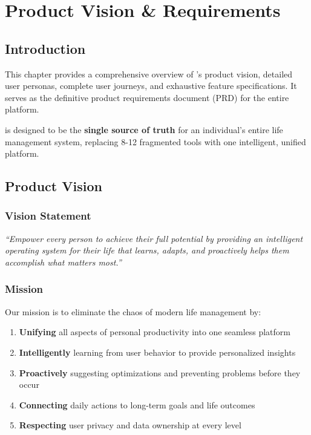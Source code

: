 \chapter{Product Vision \& Requirements}
\label{ch:product-vision}

\section{Introduction}

This chapter provides a comprehensive overview of \lifeos{}'s product vision, detailed user personas, complete user journeys, and exhaustive feature specifications. It serves as the definitive product requirements document (PRD) for the entire platform.

\begin{keypoint}
\lifeos{} is designed to be the \textbf{single source of truth} for an individual's entire life management system, replacing 8-12 fragmented tools with one intelligent, unified platform.
\end{keypoint}

\section{Product Vision}

\subsection{Vision Statement}

\begin{center}
\large\textit{``Empower every person to achieve their full potential by providing an intelligent operating system for their life that learns, adapts, and proactively helps them accomplish what matters most.''}
\end{center}

\subsection{Mission}

Our mission is to eliminate the chaos of modern life management by:

\begin{enumerate}
    \item \textbf{Unifying} all aspects of personal productivity into one seamless platform
    \item \textbf{Intelligently} learning from user behavior to provide personalized insights
    \item \textbf{Proactively} suggesting optimizations and preventing problems before they occur
    \item \textbf{Connecting} daily actions to long-term goals and life outcomes
    \item \textbf{Respecting} user privacy and data ownership at every level
\end{enumerate}

